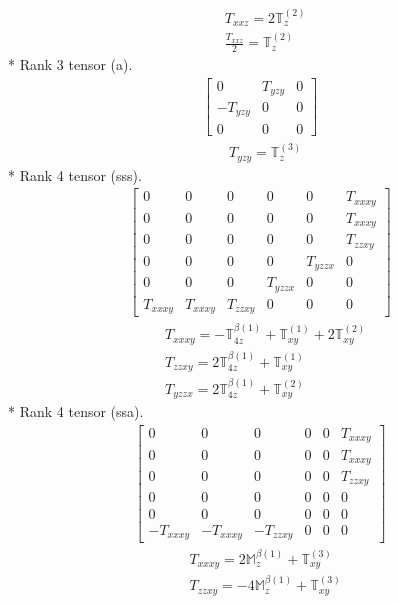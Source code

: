 \documentclass[fleqn,8pt,landscape]{jsarticle}
\begin{document}
\begin{align*}
& T_{xxz} = 2 \mathbb{T}_{z}^{(2)} \\
& \frac{T_{xxz}}{2} = \mathbb{T}_{z}^{(2)}
\end{align*}
* Rank 3 tensor (a).
\begin{align*}
\begin{bmatrix} 0 & T_{yzy} & 0 \\ - T_{yzy} & 0 & 0 \\ 0 & 0 & 0 \end{bmatrix}
\end{align*}
\begin{align*}
& T_{yzy} = \mathbb{T}_{z}^{(3)}
\end{align*}
* Rank 4 tensor (sss).
\begin{align*}
\begin{bmatrix} 0 & 0 & 0 & 0 & 0 & T_{xxxy} \\ 0 & 0 & 0 & 0 & 0 & T_{xxxy} \\ 0 & 0 & 0 & 0 & 0 & T_{zzxy} \\ 0 & 0 & 0 & 0 & T_{yzzx} & 0 \\ 0 & 0 & 0 & T_{yzzx} & 0 & 0 \\ T_{xxxy} & T_{xxxy} & T_{zzxy} & 0 & 0 & 0 \end{bmatrix}
\end{align*}
\begin{align*}
& T_{xxxy} = - \mathbb{T}_{4z}^{\beta(1)} + \mathbb{T}_{xy}^{(1)} + 2 \mathbb{T}_{xy}^{(2)} \\
& T_{zzxy} = 2 \mathbb{T}_{4z}^{\beta(1)} + \mathbb{T}_{xy}^{(1)} \\
& T_{yzzx} = 2 \mathbb{T}_{4z}^{\beta(1)} + \mathbb{T}_{xy}^{(2)}
\end{align*}
* Rank 4 tensor (ssa).
\begin{align*}
\begin{bmatrix} 0 & 0 & 0 & 0 & 0 & T_{xxxy} \\ 0 & 0 & 0 & 0 & 0 & T_{xxxy} \\ 0 & 0 & 0 & 0 & 0 & T_{zzxy} \\ 0 & 0 & 0 & 0 & 0 & 0 \\ 0 & 0 & 0 & 0 & 0 & 0 \\ - T_{xxxy} & - T_{xxxy} & - T_{zzxy} & 0 & 0 & 0 \end{bmatrix}
\end{align*}
\begin{align*}
& T_{xxxy} = 2 \mathbb{M}_{z}^{\beta(1)} + \mathbb{T}_{xy}^{(3)} \\
& T_{zzxy} = - 4 \mathbb{M}_{z}^{\beta(1)} + \mathbb{T}_{xy}^{(3)}
\end{align*}
\end{document}
